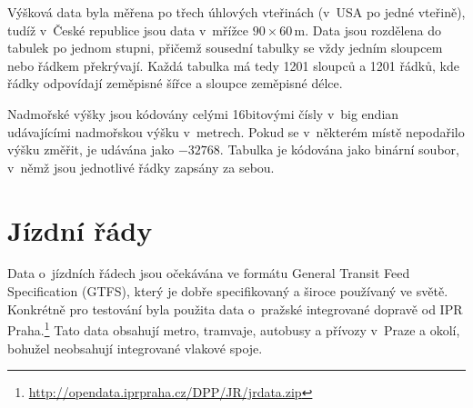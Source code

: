 Výšková data byla měřena po třech úhlových vteřinách (v~USA po jedné vteřině),
tudíž v~České republice jsou data v~mřížce $90\times60$\,m. Data jsou rozdělena
do tabulek po jednom stupni, přičemž sousední tabulky se vždy jedním sloupcem
nebo řádkem překrývají. Každá tabulka má tedy 1201 sloupců a 1201 řádků, kde
řádky odpovídají zeměpisné šířce a sloupce zeměpisné délce.

Nadmořské výšky jsou kódovány celými 16bitovými čísly v~big endian udávajícími
nadmořskou výšku v~metrech. Pokud se v~některém místě nepodařilo výšku změřit,
je udávána jako $-32768$. Tabulka je kódována jako binární soubor, v~němž jsou
jednotlivé řádky zapsány za sebou.

\section{Jízdní řády}
Data o~jízdních řádech jsou očekávána ve formátu General Transit Feed
Specification (GTFS)\cite{GTFS}, který je dobře specifikovaný a široce používaný ve světě.
Konkrétně pro testování byla použita data o~pražské integrované dopravě od IPR
Praha.\footnote{\url{http://opendata.iprpraha.cz/DPP/JR/jrdata.zip}} Tato data
obsahují metro, tramvaje, autobusy a přívozy v~Praze a okolí, bohužel neobsahují
integrované vlakové spoje.

